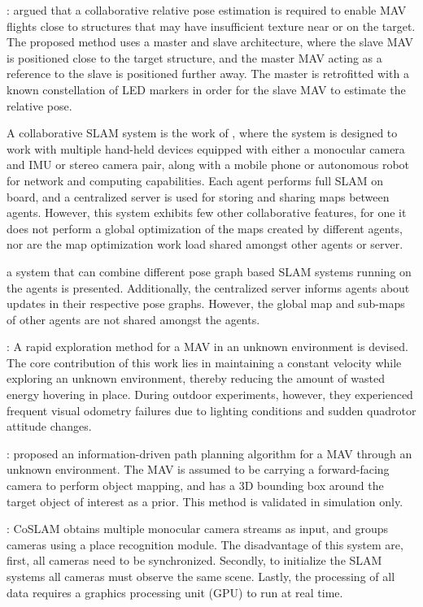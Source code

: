 \documentclass{article}
\begin{document}
: argued that a collaborative relative pose estimation
is required to enable MAV flights close to structures that may have
insufficient texture near or on the target. The proposed method uses a master
and slave architecture, where the slave MAV is positioned close to the target
structure, and the master MAV acting as a reference to the slave is positioned
further away. The master is retrofitted with a known constellation of LED
markers in order for the slave MAV to estimate the relative pose.

 A collaborative SLAM system is the work of ,
where the system is designed to work with multiple hand-held devices equipped
with either a monocular camera and IMU or stereo camera pair, along with a
mobile phone or autonomous robot for network and computing capabilities. Each
agent performs full SLAM on board, and a centralized server is used for storing
and sharing maps between agents.  However, this system exhibits few other
collaborative features, for one it does not perform a global optimization of
the maps created by different agents, nor are the map optimization work load
shared amongst other agents or server.

 a system that can combine different pose graph
based SLAM systems running on the agents is presented. Additionally, the
centralized server informs agents about updates in their respective pose
graphs. However, the global map and sub-maps of other agents are not shared
amongst the agents.

: A rapid exploration method for a MAV in an
unknown environment is devised. The core contribution of this work lies in
maintaining a constant velocity while exploring an unknown environment, thereby
reducing the amount of wasted energy hovering in place. During outdoor
experiments, however, they experienced frequent visual odometry failures due to
lighting conditions and sudden quadrotor attitude changes.

: proposed an information-driven path
planning algorithm for a MAV through an unknown environment. The MAV is assumed
to be carrying a forward-facing camera to perform object mapping, and has a 3D
bounding box around the target object of interest as a prior. This method is
validated in simulation only.

: CoSLAM obtains multiple monocular camera streams as
input, and groups cameras using a place recognition module. The disadvantage of
this system are, first, all cameras need to be synchronized.  Secondly, to
initialize the SLAM systems all cameras must observe the same scene. Lastly,
the processing of all data requires a graphics processing unit (GPU) to run at
real time.
\end{document}
